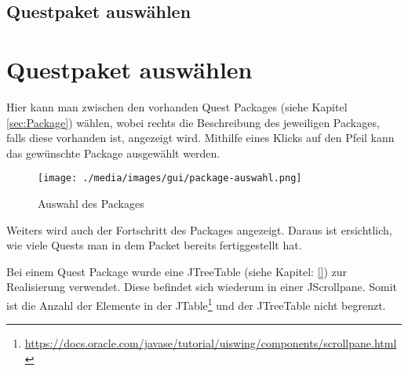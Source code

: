 \iffabian
	\subsection{Questpaket auswählen}
	\label{sec:gui-elements-package-sel}
\else
	\section{Questpaket auswählen}
	\label{sec:gui-elements-package-sel}
\fi
Hier kann man zwischen den vorhanden Quest Packages (siehe Kapitel \ref{sec:Package}) wählen, wobei rechts die Beschreibung des jeweiligen Packages, falls diese vorhanden ist, angezeigt wird. Mithilfe eines Klicks auf den Pfeil kann das gewünschte Package ausgewählt werden.

\begin{figure}[h] 
  \centering
     \texttt{[image: ./media/images/gui/package-auswahl.png]}
  \caption{Auswahl des Packages}
  \label{fig:Package_Auswahl}
\end{figure}

Weiters wird auch der Fortschritt des Packages angezeigt. Daraus ist ersichtlich, wie viele Quests man in dem Packet bereits fertiggestellt hat.

Bei einem Quest Package wurde eine JTreeTable (siehe Kapitel: \ref{}) zur Realisierung verwendet. Diese befindet sich wiederum in einer JScrollpane. Somit ist die Anzahl der Elemente in der JTable\footnote{\url{https://docs.oracle.com/javase/tutorial/uiswing/components/scrollpane.html}}  und der JTreeTable nicht begrenzt.
